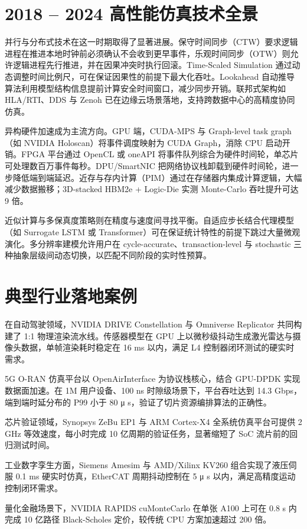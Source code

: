 \chapter{2018 – 2024 高性能仿真技术全景}
并行与分布式技术在这一时期取得了显著进展。保守时间同步（CTW）要求逻辑进程在推进本地时钟前必须确认不会收到更早事件，乐观时间同步（OTW）则允许逻辑进程先行推进，并在因果冲突时执行回滚。Time-Scaled Simulation 通过动态调整时间比例尺，可在保证因果性的前提下最大化吞吐。Lookahead 自动推导算法利用模型结构信息提前计算安全时间窗口，减少同步开销。联邦式架构如 HLA/RTI、DDS 与 Zenoh 已在边缘云场景落地，支持跨数据中心的高精度协同仿真。\par
异构硬件加速成为主流方向。GPU 端，CUDA-MPS 与 Graph-level task graph（如 NVIDIA Holoscan）将事件调度映射为 CUDA Graph，消除 CPU 启动开销。FPGA 平台通过 OpenCL 或 oneAPI 将事件队列综合为硬件时间轮，单芯片可处理数百万事件每秒。DPU/SmartNIC 把网络协议栈卸载到硬件时间轮，进一步降低端到端延迟。近存与存内计算（PIM）通过在存储器内集成计算逻辑，大幅减少数据搬移；3D-stacked HBM2e + Logic-Die 实测 Monte-Carlo 吞吐提升可达 9 倍。\par
近似计算与多保真度策略则在精度与速度间寻找平衡。自适应步长结合代理模型（如 Surrogate LSTM 或 Transformer）可在保证统计特性的前提下跳过大量微观演化。多分辨率建模允许用户在 cycle-accurate、transaction-level 与 stochastic 三种抽象层级间动态切换，以匹配不同阶段的实时性预算。\par
\chapter{典型行业落地案例}
在自动驾驶领域，NVIDIA DRIVE Constellation 与 Omniverse Replicator 共同构建了 1:1 物理渲染流水线。传感器模型在 GPU 上以微秒级抖动生成激光雷达与摄像头数据，单帧渲染耗时稳定在 16 ms 以内，满足 L4 控制器闭环测试的硬实时需求。\par
5G O-RAN 仿真平台以 OpenAirInterface 为协议栈核心，结合 GPU-DPDK 实现数据面加速。在 1M 用户设备、100 ns 时隙级场景下，平台吞吐达到 14.3 Gbps，端到端时延分布的 P99 小于 80 μ s，验证了切片资源编排算法的正确性。\par
芯片验证领域，Synopsys ZeBu EP1 与 ARM Cortex-X4 全系统仿真平台可提供 2 GHz 等效速度，每小时完成 10 亿周期的验证任务，显著缩短了 SoC 流片前的回归测试时间。\par
工业数字孪生方面，Siemens Amesim 与 AMD/Xilinx KV260 组合实现了液压伺服 0.1 ms 硬实时仿真，EtherCAT 周期抖动控制在 5 μ s 以内，满足高精度运动控制闭环需求。\par
量化金融场景下，NVIDIA RAPIDS cuMonteCarlo 在单张 A100 上可在 0.8 s 内完成 10 亿路径 Black-Scholes 定价，较传统 CPU 方案加速超过 200 倍。\par
